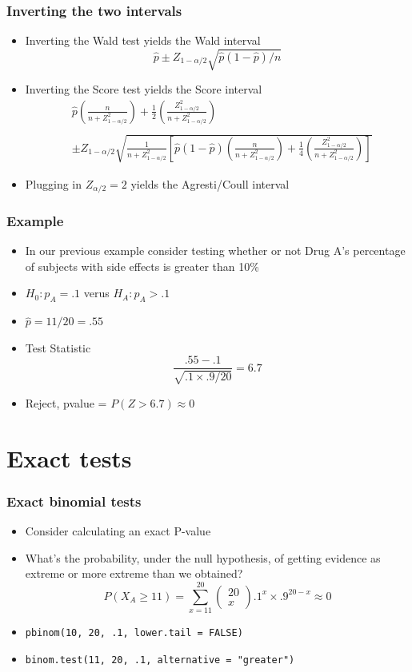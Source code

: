\documentclass[aspectratio=169]{beamer}
\begin{document}
\begin{frame}\frametitle{Inverting the two intervals}
  \begin{itemize}
  \item Inverting the Wald test yields the Wald interval
    $$
    \hat p \pm Z_{1 - \alpha / 2} \sqrt{\hat p(1 - \hat p) / n}
    $$
  \item Inverting the Score test yields the Score interval
    \small
    \begin{eqnarray*}
      &  \hat p \left(\frac{n}{n + Z_{1 - \alpha / 2}^2}\right) + 
      \frac{1}{2} \left(\frac{Z_{1 - \alpha / 2}^2}{n + Z_{1 - \alpha / 2}^2}\right) \\\\ 
      &  \pm Z_{1 - \alpha/2}\sqrt{\frac{1}{n + Z_{1 - \alpha / 2}^2} 
        \left[\hat p (1 - \hat p) \left(\frac{n}{n + Z_{1 - \alpha / 2}^2}\right) +
          \frac{1}{4} \left(\frac{Z_{1 - \alpha / 2}^2}{n + Z_{1 - \alpha / 2}^2}\right)
        \right]}
    \end{eqnarray*}
    \normalsize
  \item Plugging in $Z_{\alpha / 2} = 2$ yields the Agresti/Coull interval
  \end{itemize}
\end{frame}

\begin{frame}\frametitle{Example}
  \begin{itemize}
  \item In our previous example consider testing whether or not Drug A's
    percentage of subjects with side effects is greater than 10\%
  \item $H_0 : p_A = .1$ verus $H_A : p_A > .1$ 
  \item $\hat p = 11 / 20 = .55$
  \item Test Statistic $$\frac{.55 - .1}{\sqrt{.1 \times .9 / 20}} = 6.7$$
  \item Reject, pvalue = $P(Z > 6.7) \approx 0$
  \end{itemize}
\end{frame}

\section{Exact tests}
\begin{frame}\frametitle{Exact binomial tests} 
  \begin{itemize}
  \item Consider calculating an exact P-value
  \item What's the probability, under the null hypothesis, of getting
    evidence as extreme or more extreme than we obtained?
    $$P(X_A \geq 11) = 
    \sum_{x=11}^{20}\left(\begin{array}{c}20 \\ x \end{array}\right) .1^x\times .9^{20-x}
    \approx 0
    $$
  \item \texttt{pbinom(10, 20, .1, lower.tail = FALSE)}
  \item \texttt{binom.test(11, 20, .1, alternative = "greater")}
  \end{itemize}
\end{frame}
\end{document}
